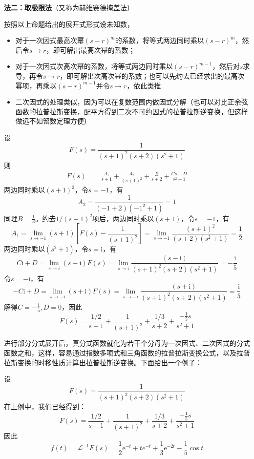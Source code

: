 \noindent \textbf{法二：取极限法}（又称为赫维赛德掩盖法）

按照以上命题给出的展开式形式设未知数，\begin{itemize}
    \item 对于一次因式最高次幂$(s-r)^m$的系数，将等式两边同时乘以$(s-r)^m$，然后令$s\to r$，即可解出最高次幂的系数；
    \item 对于一次因式次高次幂的系数，将等式两边同时乘以$(s-r)^{m-1}$，然后对$s$求导，再令$s\to r$，即可解出次高次幂的系数；也可以先约去已经求出的最高次幂项，再乘以$(s-r)^{m-1}$并令$s\to r$，依此类推
    \item 二次因式的处理类似，因为可以在复数范围内做因式分解（也可以对比正余弦函数的拉普拉斯变换，配平方得到二次不可约因式的拉普拉斯逆变换，但这样做远不如留数定理方便）
\end{itemize}

\begin{example}
    设\[F(s)=\frac{1}{(s+1)^2(s+2)(s^2+1)}\]
    则
    \begin{align*}
        F(s)&=\frac{A_1}{s+1}+\frac{A_2}{(s+1)^2}+\frac{B}{s+2}+\frac{C s+D}{s^2+1}
    \end{align*}
    两边同时乘以$(s+1)^2$，令$s=-1$，有
    \[A_2=\frac{1}{(-1+2)(-1^2+1)}=1\]
    同理$B=\frac{1}{3}$。约去$1/(s+1)^2$项后，两边同时乘以$(s+1)$，令$s=-1$，有
    \[A_1=\lim_{s\to -1}(s+1)\left[F(s)-\frac{1}{(s+1)^2}\right]=\lim_{s\to -1}\frac{(s+1)^2}{(s+2)(s^2+1)}=\frac{1}{2}\]
    两边同时乘以$(s^2+1)$，令$s=\mathrm{i}$，有
    \[C \mathrm{i}+D=\lim_{s\to i}(s-\mathrm{i})F(s)=\lim_{s\to i}\frac{(s-\mathrm{i})}{(s+1)^2(s+2)(s^2+1)}=-\frac{\mathrm{i}}{5}\]
    令$s=-\mathrm{i}$，有
    \[-C \mathrm{i}+D=\lim_{s\to -i}(s+\mathrm{i})F(s)=\lim_{s\to -i}\frac{(s+\mathrm{i})}{(s+1)^2(s+2)(s^2+1)}=\frac{\mathrm{i}}{5}\]
    解得$C=-\frac{1}{5},D=0$，因此
    \[F(s)=\frac{1/2}{s+1}+\frac{1}{(s+1)^2}+\frac{1/3}{s+2}+\frac{-\frac{1}{5}s}{s^2+1}\]
\end{example}

进行部分分式展开后，真分式函数就化为若干个分母为一次因式、二次因式的分式函数之和，这样，容易通过指数多项式和三角函数的拉普拉斯变换公式，以及拉普拉斯变换的时移性质计算出拉普拉斯逆变换。下面给出一个例子：
\begin{example}[部分分式展开法求拉普拉斯逆变换]
    设\[F(s)=\frac{1}{(s+1)^2(s+2)(s^2+1)}\]
    在上例中，我们已经得到：
    \[F(s)=\frac{1/2}{s+1}+\frac{1}{(s+1)^2}+\frac{1/3}{s+2}+\frac{-\frac{1}{5}s}{s^2+1}\]
    因此
    \[f(t)=\mathcal{L}^{-1}F(s)=\frac{1}{2}\mathrm{e}^{-t}+te^{-t}+\frac{1}{3}\mathrm{e}^{-2t}-\frac{1}{5}\cos t\]
\end{example}

